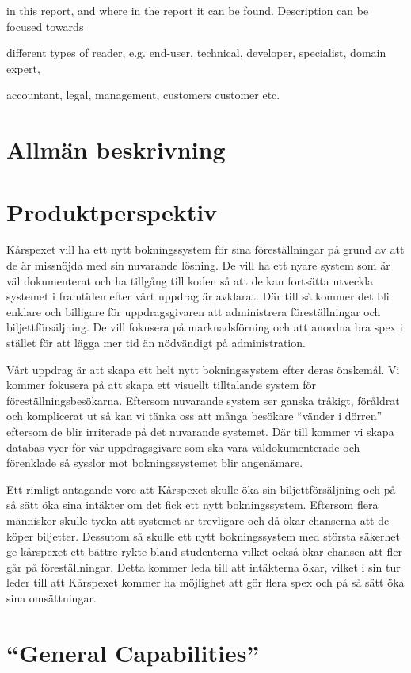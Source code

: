 \documentclass[a4paper, twoside, 11pt, titlepage]{article}
\begin{document}
in this report, and where in the report it can be found. Description can be focused towards

different types of reader, e.g. end-user, technical, developer, specialist, domain expert,

accountant, legal, management, customers customer etc.

\section{Allmän beskrivning}


\section{Produktperspektiv}

Kårspexet vill ha ett nytt bokningssystem för sina föreställningar på grund av att de är missnöjda med sin nuvarande lösning. De vill ha ett nyare system som är väl dokumenterat och ha tillgång till koden så att de kan fortsätta utveckla systemet i framtiden efter vårt uppdrag är avklarat. Där till så kommer det bli enklare och billigare för uppdragsgivaren att administrera föreställningar och biljettförsäljning. De vill fokusera på marknadsförning och att anordna bra spex i stället för att lägga mer tid än nödvändigt på administration. 

Vårt uppdrag är att skapa ett helt nytt bokningssystem efter deras önskemål. Vi kommer fokusera på att skapa ett visuellt tilltalande system för föreställningsbesökarna. Eftersom nuvarande system ser ganska tråkigt, föråldrat och komplicerat ut så kan vi tänka oss att många besökare “vänder i dörren” eftersom de blir irriterade på det nuvarande systemet. Där till kommer vi skapa databas vyer för vår uppdragsgivare som ska vara väldokumenterade och förenklade så sysslor mot bokningssystemet blir angenämare.

Ett rimligt antagande vore att Kårspexet skulle öka sin biljettförsäljning och på så sätt öka sina intäkter om det fick ett nytt bokningssystem. Eftersom flera människor skulle tycka att systemet är trevligare och då ökar chanserna att de köper biljetter. Dessutom så skulle ett nytt bokningssystem med största säkerhet ge kårspexet ett bättre rykte bland studenterna vilket också ökar chansen att fler går på föreställningar. Detta kommer leda till att intäkterna ökar, vilket i sin tur leder till att Kårspexet kommer ha möjlighet att gör flera spex och på så sätt öka sina omsättningar.

\section{``General Capabilities''}
\end{document}
